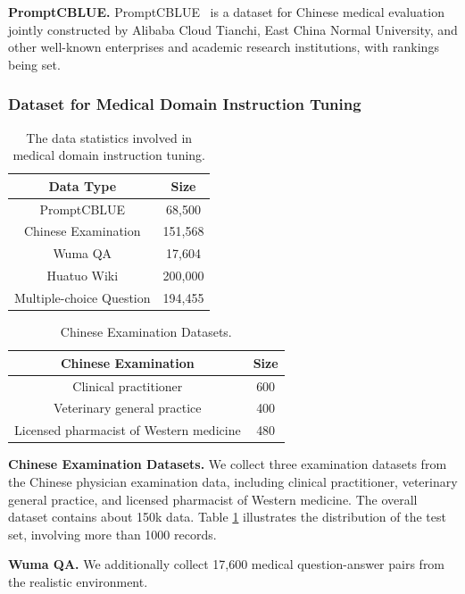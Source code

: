 \documentclass{article} %
\begin{document}
\textbf{PromptCBLUE.} PromptCBLUE~\citep{zhu2023promptcblue} is a dataset for Chinese medical evaluation jointly constructed by Alibaba Cloud Tianchi, East China Normal University, and other well-known enterprises and academic research institutions, with rankings being set.

\subsubsection{Dataset for Medical Domain Instruction Tuning}
\begin{table}
\centering
\caption{The data statistics involved in medical domain instruction tuning.}
\begin{tabular}{cc}
\toprule
Data Type        & Size \\ \midrule
PromptCBLUE            &    68,500   \\ 
Chinese Examination             & 151,568     \\
Wuma QA & 17,604  \\
Huatuo Wiki & 200,000 \\
Multiple-choice Question &  194,455 \\
\hline
\end{tabular}
\end{table}

\begin{table}[!t]
\centering
\caption{Chinese Examination Datasets.}
\label{chineseexam}
\begin{tabular}{cc}
\toprule
\textbf{Chinese Examination}                & \textbf{Size} \\ \midrule
Clinical practitioner                       & 600 \\
Veterinary general practice                 & 400 \\
Licensed pharmacist of Western medicine     & 480 \\ \midrule
\end{tabular}
\end{table}

\textbf{Chinese Examination Datasets.} We collect three examination datasets from the Chinese physician examination data, including clinical practitioner, veterinary general practice, and licensed pharmacist of Western medicine. The overall dataset contains about 150k data. Table \ref{chineseexam} illustrates the distribution of the test set, involving more than 1000 records.

\textbf{Wuma QA.} We additionally collect 17,600 medical question-answer pairs from the realistic environment.
\end{document}

